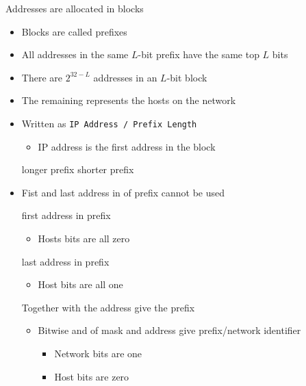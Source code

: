 \begin{itemize}
\begin{itemize}
             Addresses are allocated in blocks
                \begin{itemize}
                    \item Blocks are called prefixes
                    \item All addresses in the same $L$-bit prefix have the same top $L$ bits
                    \item There are $2^{32 - L}$ addresses in an $L$-bit block
                    \item The remaining represents the hosts on the network
                    \item Written as \verb+IP Address / Prefix Length+
                        \begin{itemize}
                            \item IP address is the first address in the block
                        \end{itemize}
                     longer prefix
                     shorter prefix
                    \item Fist and last address in of prefix cannot be used
                        \begin{itemize}
                             first address in prefix
                                \begin{itemize}
                                    \item Hosts bits are all zero
                                \end{itemize}
                             last address in prefix
                                \begin{itemize}
                                    \item Host bits are all one
                                \end{itemize}
                        \end{itemize}
                     Together with the address give the prefix
                        \begin{itemize}
                            \item Bitwise and of mask and address give prefix/network identifier
                                \begin{itemize}
                                    \item Network bits are one
                                    \item Host bits are zero

\end{itemize}
\end{itemize}
\end{itemize}
\end{itemize}
\end{itemize}
